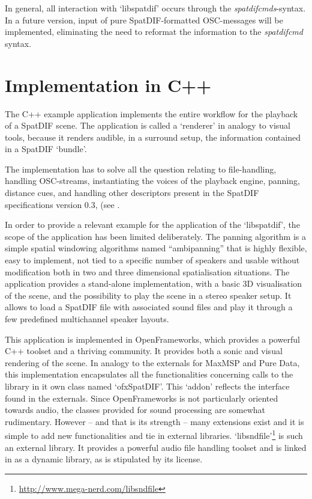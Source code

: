 \documentclass{article}
\begin{document}
In general, all interaction with `libspatdif' occurs through the \emph{spatdifcmds}-syntax.
In a future version, input of pure SpatDIF-formatted OSC-messages will be implemented, eliminating the need to reformat the information to the \emph{spatdifcmd} syntax.




\section{Implementation in C++}\label{subsec:code_application}

The C++ example application implements the entire workflow for the playback of a SpatDIF scene. 
The application is called a `renderer' in analogy to visual tools, because it renders audible, in a surround setup, the information contained in a SpatDIF `bundle'.

The implementation has to solve all the question relating to file-handling, handling OSC-streams, instantiating the voices of the playback engine, panning, distance cues, and handling other descriptors present in the SpatDIF specifications version 0.3, (see \cite{SpatDIF_03}.
% 

In order to provide a relevant example for the application of the `libspatdif', the scope of the application has been limited deliberately.
The panning algorithm is a simple spatial windowing algorithms named ``ambipanning'' \cite{Neukom:2008ambipan} that is highly flexible, easy to implement, not tied to a specific number of speakers and usable without modification both in two and three dimensional spatialisation situations.
The application provides a stand-alone implementation, with a basic 3D visualisation of the scene, and the possibility to play the scene in a stereo speaker setup.
It allows to load a SpatDIF file with associated sound files and play it through a few predefined multichannel speaker layouts.



This application is implemented in OpenFrameworks, which provides a powerful C++ toolset and a thriving community.
It provides both a sonic and visual rendering of the scene.
In analogy to the externals for MaxMSP and Pure Data, this implementation encapsulates all the functionalities concerning calls to the library in it own class named `ofxSpatDIF'.
This `addon' reflects the interface found in the externals.
Since OpenFrameworks is not particularly oriented towards audio, the classes provided for sound processing are somewhat rudimentary.
However -- and that is its strength -- many extensions exist and it is simple to add new functionalities and tie in external libraries.
`libsndfile'\footnote{\url{http://www.mega-nerd.com/libsndfile}} is such an external library. 
It provides a powerful audio file handling toolset and is linked in as a dynamic library, as is stipulated by its license.
\end{document}
